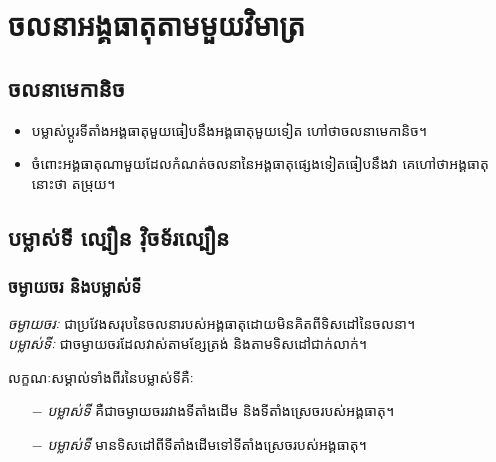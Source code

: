 \chapter{ចលនាអង្គធាតុតាមមួយវិមាត្រ}
\section{ចលនាមេកានិច}
\begin{definition}
	\begin{itemize}
		\item បម្លាស់ប្តូរទីតាំងអង្គធាតុមួយធៀបនឹងអង្គធាតុមួយទៀត ហៅថាចលនាមេកានិច។
		\item ចំពោះអង្គធាតុណាមួយដែលកំណត់ចលនានៃអង្គធាតុផ្សេងទៀតធៀបនឹងវា គេហៅថាអង្គធាតុនោះថា តម្រុយ។
	\end{itemize}
\end{definition}
\section{បម្លាស់ទី ល្បឿន វុិចទ័រល្បឿន}
\subsection{ចម្ងាយចរ និងបម្លាស់ទី}
\begin{definition}
	\emph{\kml ចម្ងាយចរៈ} ជាប្រវែងសរុបនៃចលនារបស់អង្គធាតុដោយមិនគិតពីទិសដៅនៃចលនា។\\
	\emph{\kml បម្លាស់ទីៈ} ជាចម្ងាយចរដែលវាស់តាមខ្សែត្រង់ និងតាមទិសដៅជាក់លាក់។
\end{definition}
\begin{remark}
	លក្ខណៈសម្គាល់ទាំងពីរនៃបម្លាស់ទីគឺៈ
	\begin{itemize}
		\item [$-$] \emph{បម្លាស់ទី} គឺជាចម្ងាយចររវាងទីតាំងដើម និងទីតាំងស្រេចរបស់អង្គធាតុ។
		\item [$-$] \emph{បម្លាស់ទី} មានទិសដៅពីទីតាំងដើម​ទៅទីតាំងស្រេចរបស់អង្គធាតុ។
	\end{itemize}
\end{remark}
